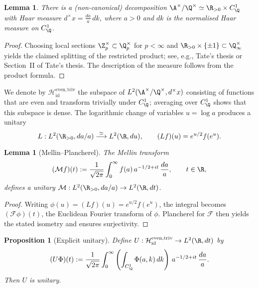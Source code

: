 ﻿\documentclass[12pt,a4paper]{article}
\newtheorem{lemma}[theorem]{Lemma}
\newtheorem{proposition}[theorem]{Proposition}
\theoremstyle{definition}
\theoremstyle{remark}
\begin{document}
\begin{lemma}\label{lem:idele-decomp}
There is a (non-canonical) decomposition
\(
  \A^\times/\Q^\times \simeq \R_{>0} \times C_\Q^1
\)
with Haar measure $d^\times x = \frac{da}{a}\,dk$, where $a>0$ and $dk$ is the normalised Haar measure on $C_\Q^1$.
\end{lemma}

\begin{proof}
Choosing local sections $\Z_p^\times\subset\Q_p^\times$ for $p<\infty$ and $\R_{>0}\times\{\pm1\}\subset\Q_\infty^\times$ yields the claimed splitting of the restricted product; see, e.g., Tate's thesis or Section~II of Tate's thesis.  The description of the measure follows from the product formula.
\end{proof}

We denote by $\mathcal H_{\mathrm{id}}^{\mathrm{even,triv}}$ the subspace of $L^2(\A^\times/\Q^\times,d^\times x)$ consisting of functions that are even and transform trivially under $C_\Q^1$; averaging over $C_\Q^1$ shows that this subspace is dense.  The logarithmic change of variables $u=\log a$ produces a unitary
\begin{equation}\label{eq:log-unitary}
  L: L^2(\R_{>0},da/a) \stackrel{\simeq}{\longrightarrow} L^2(\R,du),
  \qquad (Lf)(u)=e^{u/2}f(e^u).
\end{equation}

\begin{lemma}[Mellin--Plancherel]\label{lem:mellin-plancherel}
The Mellin transform
\[
  (\mathcal M f)(t)
  := \frac{1}{\sqrt{2\pi}}\int_0^\infty f(a)\,a^{-1/2+it}\,\frac{da}{a},
  \qquad t\in\R,
\]
defines a unitary $ \mathcal M : L^2(\R_{>0},da/a) \to L^2(\R,dt) $.
\end{lemma}

\begin{proof}
Writing $\phi(u)= (Lf)(u)=e^{u/2}f(e^u)$, the integral becomes $(\mathcal F\phi)(t)$, the Euclidean Fourier transform of $\phi$.  Plancherel for $\mathcal F$ then yields the stated isometry and ensures surjectivity.
\end{proof}

\begin{proposition}[Explicit unitary]\label{prop:idele-unitary}
Define $U:\mathcal H_{\mathrm{id}}^{\mathrm{even,triv}}\to L^2(\R,dt)$ by
\[
  (U\Phi)(t)
  := \frac{1}{\sqrt{2\pi}}\int_0^\infty
     \left( \int_{C_\Q^1}\Phi(a,k)\,dk \right)\,
     a^{-1/2+it}\,\frac{da}{a}.
\]
Then $U$ is unitary.
\end{proposition}
\end{document}
